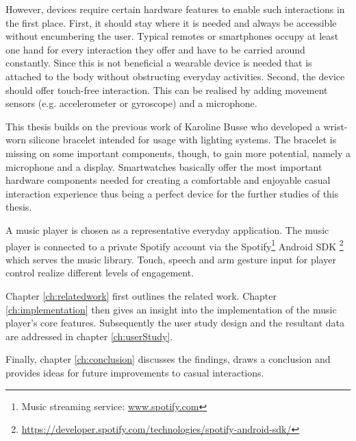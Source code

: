However, devices require certain hardware features to enable such interactions in the first place. First, it should stay where it is needed and always be accessible without encumbering the user. Typical remotes or smartphones occupy at least one hand for every interaction they offer and have to be carried around constantly. Since this is not beneficial a wearable device is needed that is attached to the body without obstructing everyday activities.
Second, the device should offer touch-free interaction. This can be realised by adding movement sensors (e.g. accelerometer or gyroscope) and a microphone\cite{Busse2014Thesis}.

This thesis builds on the previous work of Karoline Busse \cite{Busse2014Thesis} who developed a wrist-worn silicone bracelet intended for usage with lighting systems. The bracelet is missing on some important components, though, to gain more potential, namely a microphone and a display. Smartwatches basically offer the most important hardware components needed for creating a comfortable and enjoyable casual interaction experience thus being a perfect device for the further studies of this thesis.

A music player is chosen as a representative everyday application. The music player is connected to a private Spotify account via the Spotify\footnote{Music streaming service: \url{www.spotify.com}} Android \ac{SDK} \footnote{\url{https://developer.spotify.com/technologies/spotify-android-sdk/}} which serves the music library. Touch, speech and arm gesture input for player control realize different levels of engagement.

Chapter \ref{ch:relatedwork} first outlines the related work. Chapter \ref{ch:implementation} then gives an insight into the implementation of the music player's core features. Subsequently the user study design and the resultant data are addressed in chapter \ref{ch:userStudy}.

Finally, chapter \ref{ch:conclusion} discusses the findings, draws a conclusion and provides ideas for future improvements to casual interactions.







